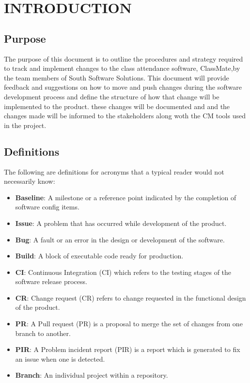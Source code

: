 \documentclass[letterpaper,12pt,oneside,listof=totoc]{scrreprt}
\begin{document}
\chapter{INTRODUCTION}

\section{Purpose}

The purpose of this document is to outline the procedures and strategy required to track and implement
changes to the class attendance software, ClassMate,by the team members of South Software Solutions.
This document will provide feedback and suggestions on how to move and push changes during the 
software development process and define the structure of how that change will be implemented to the product.
these changes will be documented and and the changes made will be informed to the stakeholders
along woth the CM tools used in the project.

\section{Definitions}

The following are definitions for acronyms that a typical reader would not necessarily know: 
\begin{itemize}
    \item \textbf{Baseline}: A milestone or a reference point indicated by the completion of software config items.
    \item \textbf{Issue}: A problem that has occurred while development of the product.
    \item \textbf{Bug}: A fault or an error in the design or development of the software.
    \item \textbf{Build}: A block of executable code ready for production.
    \item \textbf{CI}: Continuous Integration (CI) which refers to the testing stages of the software release process.
    \item \textbf{CR}: Change request (CR) refers to change requested in the functional design of the product.
    \item \textbf{PR}: A Pull request (PR) is a proposal to merge the set of changes from one branch to another.
    \item \textbf{PIR}: A Problem incident report (PIR) is a report which is generated to fix an issue when one is detected.
    \item \textbf{Branch}: An individual project within a repository.
\end{itemize}
\end{document}
